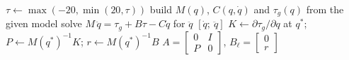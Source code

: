 \begin{algorithm}[H]
\caption{Nonlinear dynamics $\dot x=f(x,\tau)$ (\texttt{Acrobot\_Nonlinear\_Dynamics.m}) and linearization (\texttt{Acrobot\_Linearize.m})}
\label{alg:model}
\begin{algorithmic}[1]
  \State $\tau\gets\max(-20,\min(20,\tau))$ 
  \State build $M(q)$, $C(q,\dot q)$ and $\tau_g(q)$ from the given model
  \State solve $M\,\ddot q=\tau_g+B\tau-C\dot q$ for $\ddot q$ 
  \State \Return $[\dot q;\ \ddot q]$
\EndFunction
{}
  \State $K\gets\partial\tau_g/\partial q$ at $q^*$; \quad $P\gets M(q^*)^{-1}K$; \quad $r\gets M(q^*)^{-1}B$
  \State \Return $A=\begin{bmatrix}0&I\\P&0\end{bmatrix}$, $B_\ell=\begin{bmatrix}0\\r\end{bmatrix}$
\EndFunction
\end{algorithmic}
\end{algorithm}
